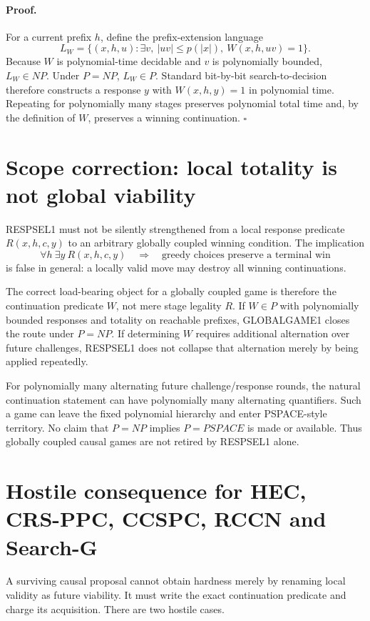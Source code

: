 \documentclass[11pt]{article}
\begin{document}
\paragraph{Proof.}
For a current prefix \(h\), define the prefix-extension language
\[
L_W=\{(x,h,u):\exists v,\ |uv|\le p(|x|),\ W(x,h,uv)=1\}.
\]
Because \(W\) is polynomial-time decidable and \(v\) is polynomially bounded, \(L_W\in NP\). Under \(P=NP\), \(L_W\in P\). Standard bit-by-bit search-to-decision therefore constructs a response \(y\) with \(W(x,h,y)=1\) in polynomial time. Repeating for polynomially many stages preserves polynomial total time and, by the definition of \(W\), preserves a winning continuation. \(\square\)

\section*{Scope correction: local totality is not global viability}
RESPSEL1 must not be silently strengthened from a local response predicate \(R(x,h,c,y)\) to an arbitrary globally coupled winning condition. The implication
\[
\forall h\ \exists y\ R(x,h,c,y)
\quad\Longrightarrow\quad
\text{greedy choices preserve a terminal win}
\]
is false in general: a locally valid move may destroy all winning continuations.

The correct load-bearing object for a globally coupled game is therefore the continuation predicate \(W\), not mere stage legality \(R\). If \(W\in P\) with polynomially bounded responses and totality on reachable prefixes, GLOBALGAME1 closes the route under \(P=NP\). If determining \(W\) requires additional alternation over future challenges, RESPSEL1 does not collapse that alternation merely by being applied repeatedly.

For polynomially many alternating future challenge/response rounds, the natural continuation statement can have polynomially many alternating quantifiers. Such a game can leave the fixed polynomial hierarchy and enter PSPACE-style territory. No claim that \(P=NP\) implies \(P=PSPACE\) is made or available. Thus globally coupled causal games are not retired by RESPSEL1 alone.

\section*{Hostile consequence for HEC, CRS-PPC, CCSPC, RCCN and Search-G}
A surviving causal proposal cannot obtain hardness merely by renaming local validity as future viability. It must write the exact continuation predicate and charge its acquisition. There are two hostile cases.
\end{document}
